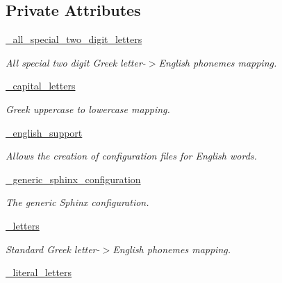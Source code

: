 \subsection*{Private Attributes}
\begin{DoxyCompactItemize}
\item 
\hyperlink{classrapp__speech__detection__sphinx4_1_1greek__support_1_1GreekSupport_a533b86fa7f9105c49d0a729140d76c27}{\-\_\-all\-\_\-special\-\_\-two\-\_\-digit\-\_\-letters}
\begin{DoxyCompactList}\small\item\em All special two digit Greek letter-\/$>$English phonemes mapping. \end{DoxyCompactList}\item 
\hyperlink{classrapp__speech__detection__sphinx4_1_1greek__support_1_1GreekSupport_a69f45d4217814cba24edcb2e5597956b}{\-\_\-capital\-\_\-letters}
\begin{DoxyCompactList}\small\item\em Greek uppercase to lowercase mapping. \end{DoxyCompactList}\item 
\hyperlink{classrapp__speech__detection__sphinx4_1_1greek__support_1_1GreekSupport_aff5fd96d6423b28163b900c2ea06e188}{\-\_\-english\-\_\-support}
\begin{DoxyCompactList}\small\item\em Allows the creation of configuration files for English words. \end{DoxyCompactList}\item 
\hyperlink{classrapp__speech__detection__sphinx4_1_1greek__support_1_1GreekSupport_a1c206d8793dce070075c50b4e0800a16}{\-\_\-generic\-\_\-sphinx\-\_\-configuration}
\begin{DoxyCompactList}\small\item\em The generic Sphinx configuration. \end{DoxyCompactList}\item 
\hyperlink{classrapp__speech__detection__sphinx4_1_1greek__support_1_1GreekSupport_a6115cc5d04ce7f8e891f5b112f8d4151}{\-\_\-letters}
\begin{DoxyCompactList}\small\item\em Standard Greek letter-\/$>$English phonemes mapping. \end{DoxyCompactList}\item 
\hyperlink{classrapp__speech__detection__sphinx4_1_1greek__support_1_1GreekSupport_a553a5e8b07dc6b3b9b83a2f814535204}{\-\_\-literal\-\_\-letters}

\end{DoxyCompactItemize}
